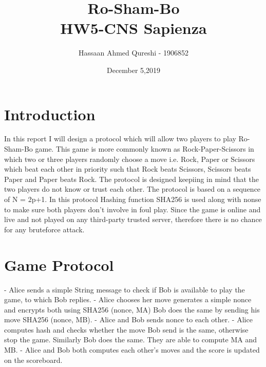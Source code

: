 \documentclass[11pt]{article}
\begin{document}
\title{%
	Ro-Sham-Bo\\
	\large HW5-CNS Sapienza}

\author{Hassaan Ahmed Qureshi - 1906852}
\date{December 5,2019}
\maketitle{}
\newpage
\tableofcontents

\newpage

\section{Introduction}
In this report I will design a protocol which will allow two players to play Ro-Sham-Bo game. This game is more commonly known as Rock-Paper-Scissors in which two or three players randomly choose a move i.e. Rock, Paper or Scissors which beat each other in priority such that Rock beats Scissors, Scissors beats Paper and Paper beats Rock. The protocol is designed keepiing in mind that the two players do not know or trust each other. The protocol is based on a sequence of N = 2p+1. In this protocol Hashing function SHA256 is used along with nonse to make sure both players don't involve in foul play. \newline \newline Since the game is online and live and not played on any third-party trusted server, therefore there is no chance for any bruteforce attack.


\section{Game Protocol}
-	Alice sends a simple String message to check if Bob is available to play the game, to which Bob replies.\newline \newline
-	Alice chooses her move generates a simple nonce and encrypts both using SHA256 (nonce, MA) Bob does the same by sending his move SHA256 (nonce, MB).\newline \newline
-	Alice and Bob sends nonce to each other.\newline \newline
-	Alice computes hash and checks whether the move Bob send is the same, otherwise stop the game. Similarly Bob does the same. They are able to compute MA and MB.\newline \newline
-	Alice and Bob both computes each other’s moves and the score is updated on the scoreboard.\newline \newline
\end{document}
